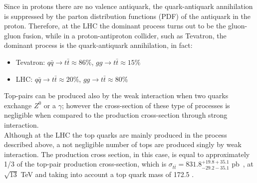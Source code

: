 \newline Since in protons there are no valence antiquark, the quark-antiquark annihilation is suppressed by 
the parton distribution functions (PDF) of the antiquark in the proton. Therefore, at the LHC the dominant process turns out to be the
gluon-gluon fusion, while in a proton-antiproton collider, such as Tevatron,
the dominant process is the quark-antiquark annihilation, in fact:
\begin{itemize}
	\item Tevatron: $q\bar{q}\rightarrow t\bar{t} \approx 86\%$, $gg\rightarrow t\bar{t} \approx 15\%$
	\item LHC: $q\bar{q}\rightarrow t\bar{t} \approx 20\%$, $gg\rightarrow t\bar{t} \approx 80\%$
\end{itemize}
Top-pairs can be produced also by the weak interaction when two quarks exchange $Z^0$ or a $\gamma$; however the cross-section of these
type of processes is negligible when compared to the production cross-section through strong interaction.\\
Although at the LHC the top quarks are mainly produced in the process described above, a not negligible number of tops 
are produced singly by weak interaction. The production cross section, in this case, is equal to approximately 1/3 of the top-pair production
cross-section, which is $\sigma_{t\bar{t}} = 831.8^{+19.8+35.1}_{-29.2-35.1}$ pb~\cite{pdg}, at $\sqrt{13}$ TeV and taking into account a top quark mass of 172.5 \GeV.

